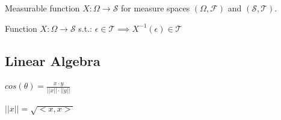  Measurable function \(X: \Omega \rightarrow \mathcal{S}\) for measure spaces \((\Omega, \mathcal{F})\) and \((\mathcal{S}, \mathcal{T})\).

 Function \(X: \Omega \rightarrow \mathcal{S}\) s.t.:
$\epsilon\in\mathcal{T} \implies X^{-1}(\epsilon)\in\mathcal{T}$

\subsection{Linear Algebra}
\begin{enumerate*}[label=\textbullet, itemjoin={\quad}]
    \item \(cos(\theta) = \frac{x \cdot y}{||x||\cdot||y||}\)
    \item \(||x|| = \sqrt{<x,x>}\)
\end{enumerate*}